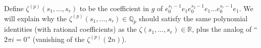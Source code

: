 \documentclass[12pt,leqno]{article}
\newcommand{\dbQ}{{\mathbb{Q}}}
\newcommand{\dbR}{{\mathbb{R}}}
\begin{document}
Define $\zeta^{(p)}(s_1,\dotsc,s_r)$ to be the
coefficient in $g$ of
$e_0^{s_1-1}e_1e_0^{s_2-1}e_1\ldots
e_0^{s_r-1}e_1$.
We will explain why the
$\zeta^{(p)}(s_1,\dotsc,s_r)\in\dbQ_p$ should
satisfy the same polynomial identities (with
rational coefficients) as the
$\zeta(s_1,\dotsc,s_r)\in\dbR$, plus the
analog of ``$2\pi i=0$'' (vanishing of the
$\zeta^{(p)}(2n)$).
\end{document}
